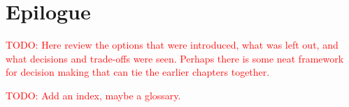 \documentclass[11pt]{book}
\newcommand{\todo}[1]{\textcolor{red}{TODO: #1}} %
\begin{document}













\chapter*{Epilogue}

\todo{Here review the options that were introduced, what was left out, and what decisions and trade-offs were seen.  Perhaps there is some neat framework for decision making that can tie the earlier chapters together.}

\todo{Add an index, maybe a glossary.}
\end{document}
